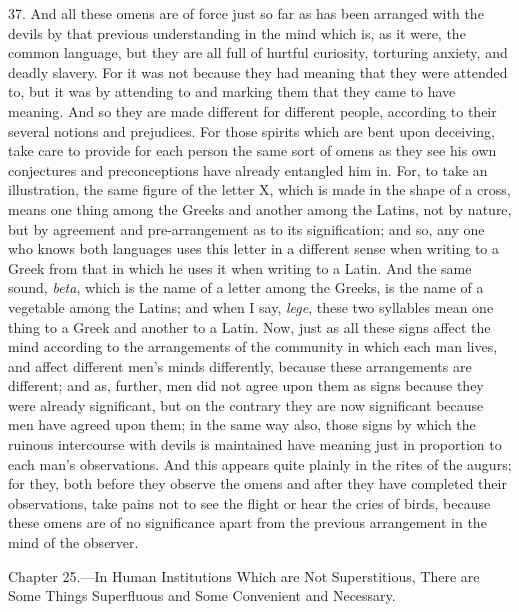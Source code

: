 37. And all these omens are of force just so far as has been arranged with the devils by that previous understanding in the mind which is, as it were, the common language, but they are all full of hurtful curiosity, torturing anxiety, and deadly slavery. For it was not because they had meaning that they were attended to, but it was by attending to and marking them that they came to have meaning. And so they are made different for different people, according to their several notions and prejudices. For those spirits which are bent upon deceiving, take care to provide for each person the same sort of omens as they see his own conjectures and preconceptions have already entangled him in. For, to take an illustration, the same figure of the letter X, which is made in the shape of a cross, means one thing among the Greeks and another among the Latins, not by nature, but by agreement and pre-arrangement as to its signification; and so, any one who knows both languages uses this letter in a different sense when writing to a Greek from that in which he uses it when writing to a Latin. And the same sound, \emph{beta}, which is the name of a letter among the Greeks, is the name of a vegetable among the Latins; and when I say, \emph{lege}, these two syllables mean one thing to a Greek and another to a Latin. Now, just as all these signs affect the mind according to the arrangements of the community in which each man lives, and affect different men’s minds differently, because these arrangements are different; and as, further, men did not agree upon them as  signs because they were already significant, but on the contrary they are now significant because men have agreed upon them; in the same way also, those signs by which the ruinous intercourse with devils is maintained have meaning just in proportion to each man’s observations. And this appears quite plainly in the rites of the augurs; for they, both before they observe the omens and after they have completed their observations, take pains not to see the flight or hear the cries of birds, because these omens are of no significance apart from the previous arrangement in the mind of the observer.


Chapter 25.—In Human Institutions Which are Not Superstitious, There are Some Things Superfluous and Some Convenient and Necessary.

